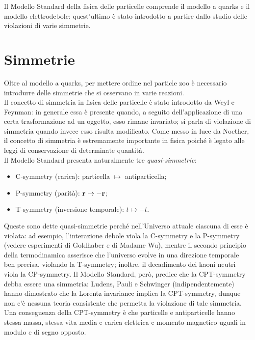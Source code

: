 
Il Modello Standard della fisica delle particelle comprende il modello a quarks e il modello elettrodebole: quest'ultimo è stato introdotto a partire dallo studio delle violazioni di varie simmetrie.

\section{Simmetrie}

Oltre al modello a quarks, per mettere ordine nel particle zoo è necessario introdurre delle simmetrie che si osservano in varie reazioni.\\
Il concetto di simmetria in fisica delle particelle è stato introdotto da Weyl e Feynman: in generale essa è presente quando, a seguito dell'applicazione di una certa trasformazione ad un oggetto, esso rimane invariato; si parla di violazione di simmetria quando invece esso risulta modificato. Come messo in luce da Noether, il concetto di simmetria è estremamente importante in fisica poiché è legato alle leggi di conservazione di determinate quantità.\\
Il Modello Standard presenta naturalmente tre \textit{quasi-simmetrie}:
\begin{itemize}
	\item C-symmetry (carica): particella $ \mapsto $ antiparticella;
	\item P-symmetry (parità): $ \mathbf{r} \mapsto -\mathbf{r} $;
	\item T-symmetry (inversione temporale): $ t \mapsto -t $.
\end{itemize}
Queste sono dette quasi-simmetrie perché nell'Universo attuale ciascuna di esse è violata: ad esempio, l'interazione debole viola la C-symmetry e la P-symmetry (vedere esperimenti di Goldhaber e di Madame Wu), mentre il secondo principio della termodinamica asserisce che l'universo evolve in una direzione temporale ben precisa, violando la T-symmetry; inoltre, il decadimento dei kaoni neutri viola la CP-symmetry. Il Modello Standard, però, predice che la CPT-symmetry debba essere una simmetria: Ludens, Pauli e Schwinger (indipendentemente) hanno dimostrato che la Lorentz invariance implica la CPT-symmetry, dunque non c'è nessuna teoria consistente che permetta la violazione di tale simmetria. Una conseguenza della CPT-symmetry è che particelle e antiparticelle hanno stessa massa, stessa vita media e carica elettrica e momento magnetico uguali in modulo e di segno opposto.

